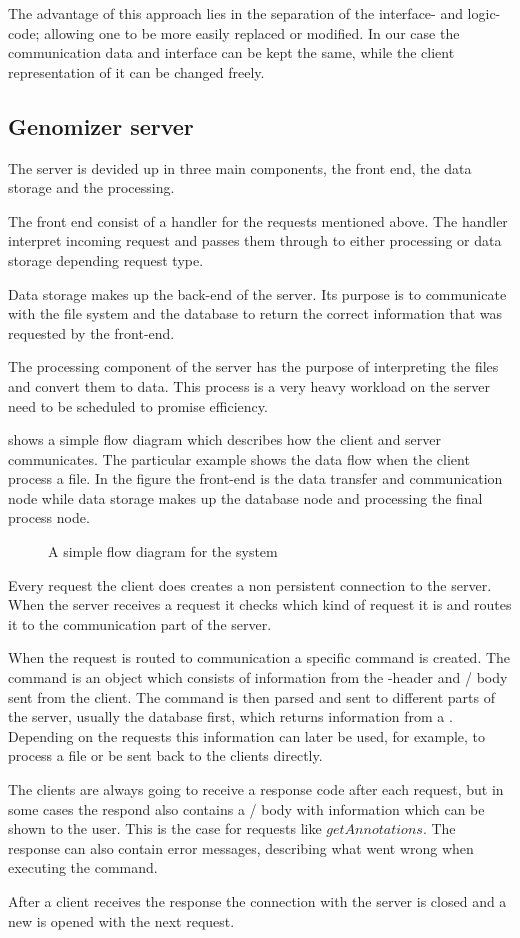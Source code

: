  The advantage of this approach lies in the separation of the interface- and logic-code; allowing one to be more easily replaced or modified. In our case the communication data and interface can be kept the same, while the client representation of it can be changed freely.
 

\subsection{Genomizer server}
The server is devided up in three main components, the front end, the data storage and the processing.

The front end consist of a handler for the  requests mentioned above. The handler interpret incoming request and passes them through to either processing or data storage depending request type.

Data storage makes up the back-end of the server. Its purpose is to communicate with the file system and the database to return the correct information that was requested by the front-end.

The processing component of the server has the purpose of interpreting the  files and convert them to  data. This process is a very heavy workload on the server need to be scheduled to promise efficiency. 

 shows a simple flow diagram which describes how the client and server
 communicates. The particular example shows the data flow when the client process a file.
 In the figure the front-end is the data transfer and communication node while data storage makes up the database node and processing the final process node.

\begin{figure}[htb]
\caption{A simple flow diagram for the system}
\label{fig:com_systemoverview}
\end{figure}

Every request the client does creates a non persistent connection to
the server. When the server receives a request it checks which kind of
request it is and routes it to the communication part of the server.

When the request is routed to communication a specific command is
created. The command is an object which consists of information from
the -header and \json/ body sent from the
client. The command is then parsed and sent to different parts of the
server, usually the database first, which returns information from a
. Depending on the requests this information can later
be used, for example, to process a file or be sent back to the clients
directly.

The clients are always going to receive a response code after each
request, but in some cases the respond also contains a \json/
body with information which can be shown to the user. This is the case
for requests like $getAnnotations$. The response can also contain
error messages, describing what went wrong when executing the command.

After a client receives the response the connection with the server is
closed and a new is opened with the next request.
